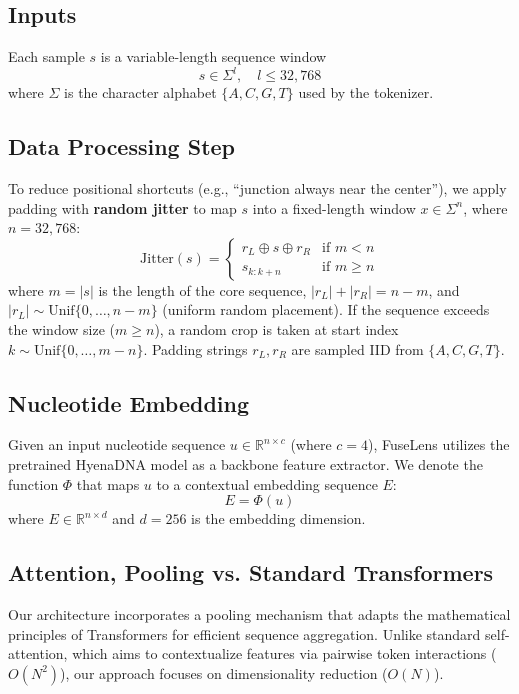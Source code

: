 \documentclass{bioinfo}
\begin{document}
\subsection{Inputs}
Each sample $s$ is a variable-length sequence window
\begin{equation}
s \in \Sigma^{l}, \quad l \le 32{,}768
\end{equation}
where $\Sigma$ is the character alphabet $\{A,C,G,T\}$ used by the tokenizer.

\subsection{Data Processing Step}
To reduce positional shortcuts (e.g., ``junction always near the center''), we apply padding with \textbf{random jitter} to map $s$ into a fixed-length window $x\in\Sigma^n$, where $n = 32,768$:
\begin{equation}
\mathrm{Jitter}(s) =
\begin{cases}
r_L \oplus s \oplus r_R & \text{if } m < n\\
s_{k:k+n} & \text{if } m \ge n
\end{cases}
\end{equation}
where $m=|s|$ is the length of the core sequence, $|r_L|+|r_R|=n-m$, and $|r_L|\sim \mathrm{Unif}\{0,\dots,n-m\}$ (uniform random placement). If the sequence exceeds the window size ($m \ge n$), a random crop is taken at start index $k\sim \mathrm{Unif}\{0,\dots,m-n\}$. Padding strings $r_L, r_R$ are sampled IID from $\{A,C,G,T\}$.

\subsection{Nucleotide Embedding}
Given an input nucleotide sequence $u \in \mathbb{R}^{n \times c}$ (where $c = 4$), FuseLens utilizes the pretrained HyenaDNA model \cite{hyenadna} as a backbone feature extractor. We denote the function $\Phi$ that maps $u$ to a contextual embedding sequence $E$:
\begin{equation}
E = \Phi(u)
\end{equation}
where $E \in \mathbb{R}^{n \times d}$ and $d=256$ is the embedding dimension.

\subsection{Attention, Pooling vs. Standard Transformers}
Our architecture incorporates a pooling mechanism that adapts the mathematical principles of Transformers for efficient sequence aggregation. Unlike standard self-attention, which aims to contextualize features via pairwise token interactions ($O(N^2)$), our approach focuses on dimensionality reduction ($O(N)$).
\end{document}
